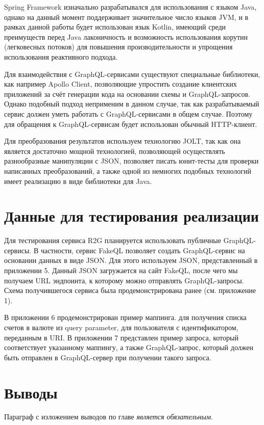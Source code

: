 Spring Framework изначально разрабатывался для использования с языком Java, однако на данный момент поддерживает значительное число языков JVM, и в рамках данной работы будет использован язык Kotlin, имеющий среди преимуществ перед Java лаконичность и возможность использования корутин (легковесных потоков) для повышения производительности и упрощения использования реактивного подхода.

Для взаимодействия с GraphQL-сервисами существуют специальные библиотеки, как например Apollo Client, позволяющие упростить создание клиентских приложений за счёт генерации кода на основании схемы и GraphQL-запросов.
Однако подобный подход неприменим в данном случае, так как разрабатываемый сервис должен уметь работать с GraphQL-сервисами в общем случае.
Поэтому для обращения к GraphQL-сервисам будет использован обычный HTTP-клиент.

Для преобразования результатов используем технологию JOLT, так как она является достаточно мощной технологией, позволяющей осуществлять разнообразные манипуляции с JSON, позволяет писать юнит-тесты для проверки написанных преобразований, а также одной из немногих подобных технологий имеет реализацию в виде библиотеки для Java.


\section{Данные для тестирования реализации}\label{sec:testing-data}

Для тестирования сервиса R2G планируется использовать публичные GraphQL-сервисы.
В частности, сервис FakeQL позволяет создать GraphQL-сервис на основании данных в виде JSON. Для этого используем JSON, представленный в приложении 5.
Данный JSON загружается на сайт FakeQL, после чего мы получаем URL эндпоинта, к которому можно отправлять GraphQL-запросы.
Схема получившегося сервиса была продемонстрирована ранее (см.
приложение 1).

В приложении 6 продемонстрирован пример маппинга.
для получения списка счетов в валюте из query parameter, для пользователя с идентификатором, переданным в URI. В приложении 7 представлен пример запроса, который соответствует указанному маппингу, а также GraphQL-запрос, который должен быть отправлен в GraphQL-сервер при получении такого запроса.


\section{Выводы} \label{sec:conclusion-practive}

Параграф с изложением выводов по главе \textit{является обязательным}.